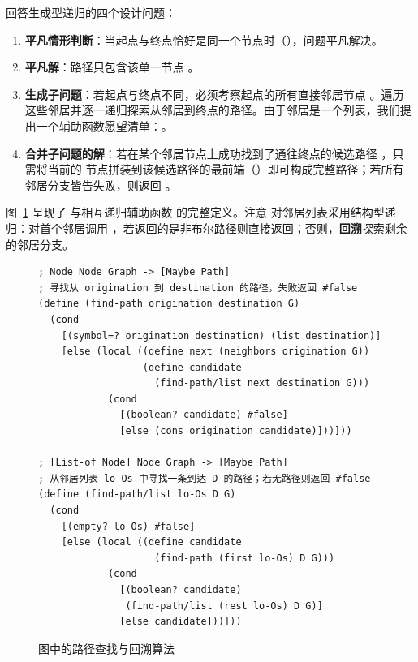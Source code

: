 回答生成型递归的四个设计问题：
\begin{enumerate}
  \item \textbf{平凡情形判断}：当起点与终点恰好是同一个节点时（），问题平凡解决。
  \item \textbf{平凡解}：路径只包含该单一节点 。
  \item \textbf{生成子问题}：若起点与终点不同，必须考察起点的所有直接邻居节点 。遍历这些邻居并逐一递归探索从邻居到终点的路径。由于邻居是一个列表，我们提出一个辅助函数愿望清单：。
  \item \textbf{合并子问题的解}：若在某个邻居节点上成功找到了通往终点的候选路径 ，只需将当前的  节点拼装到该候选路径的最前端（）即可构成完整路径；若所有邻居分支皆告失败，则返回 。
\end{enumerate}

图~\ref{fig:find-path-code} 呈现了  与相互递归辅助函数  的完整定义。注意  对邻居列表采用结构型递归：对首个邻居调用 ，若返回的是非布尔路径则直接返回；否则，\textbf{回溯}探索剩余的邻居分支。

\begin{figure}[htbp]
  \centering
\begin{lstlisting}[language=BSL]
; Node Node Graph -> [Maybe Path]
; 寻找从 origination 到 destination 的路径，失败返回 #false
(define (find-path origination destination G)
  (cond
    [(symbol=? origination destination) (list destination)]
    [else (local ((define next (neighbors origination G))
                  (define candidate
                    (find-path/list next destination G)))
            (cond
              [(boolean? candidate) #false]
              [else (cons origination candidate)]))]))

; [List-of Node] Node Graph -> [Maybe Path]
; 从邻居列表 lo-Os 中寻找一条到达 D 的路径；若无路径则返回 #false
(define (find-path/list lo-Os D G)
  (cond
    [(empty? lo-Os) #false]
    [else (local ((define candidate
                    (find-path (first lo-Os) D G)))
            (cond
              [(boolean? candidate)
               (find-path/list (rest lo-Os) D G)]
              [else candidate]))]))
\end{lstlisting}
  \caption{图中的路径查找与回溯算法}
  \label{fig:find-path-code}
\end{figure}

